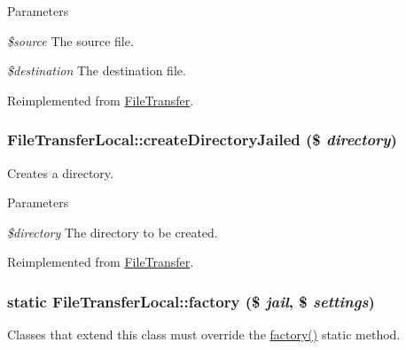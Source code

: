 \begin{DoxyParams}{Parameters}
\item[{\em \$source}]The source file. \item[{\em \$destination}]The destination file. \end{DoxyParams}


Reimplemented from \hyperlink{classFileTransfer_a9ca65dc0107476d044cf18c0873f4a90}{FileTransfer}.\hypertarget{classFileTransferLocal_aa578801cec3774f44a51d6b33cd5b1fd}{
\subsubsection[{createDirectoryJailed}]{\setlength{\rightskip}{0pt plus 5cm}FileTransferLocal::createDirectoryJailed (\$ {\em directory})}}
\label{classFileTransferLocal_aa578801cec3774f44a51d6b33cd5b1fd}
Creates a directory.


\begin{DoxyParams}{Parameters}
\item[{\em \$directory}]The directory to be created. \end{DoxyParams}


Reimplemented from \hyperlink{classFileTransfer_a585c6cfab189aabbee70a624a50af975}{FileTransfer}.\hypertarget{classFileTransferLocal_aee03476a89446c2e6fb8d9a666739bd5}{
\subsubsection[{factory}]{\setlength{\rightskip}{0pt plus 5cm}static FileTransferLocal::factory (\$ {\em jail}, \/  \$ {\em settings})}}
\label{classFileTransferLocal_aee03476a89446c2e6fb8d9a666739bd5}
Classes that extend this class must override the \hyperlink{classFileTransferLocal_aee03476a89446c2e6fb8d9a666739bd5}{factory()} static method.


